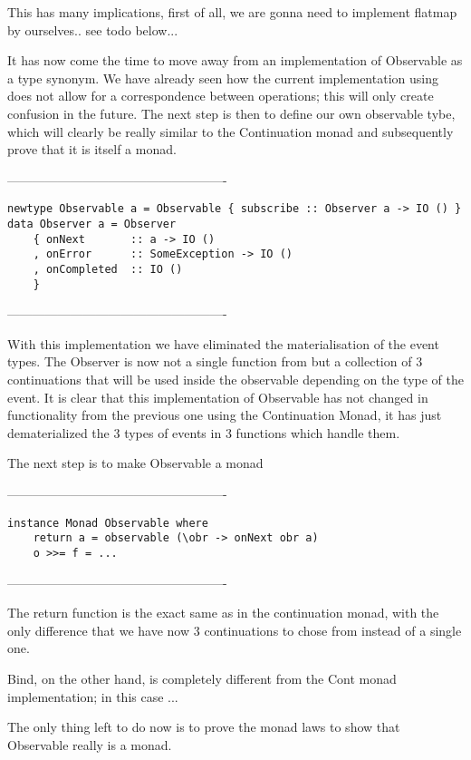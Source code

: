 This has many implications, first of all, we are gonna need to implement flatmap by ourselves.. see todo below...

It has now come the time to move away from an implementation of Observable as a type synonym. We have already seen how the current implementation using  does not allow for a correspondence between \code{>>=} operations; this will only create confusion in the future. The next step is then to define our own observable tybe, which will clearly be really similar to the Continuation monad and subsequently prove that it is itself a monad. 

----------------------------------------------------
\begin{verbatim}
newtype Observable a = Observable { subscribe :: Observer a -> IO () } 
data Observer a = Observer 
    { onNext       :: a -> IO ()
    , onError      :: SomeException -> IO ()
    , onCompleted  :: IO ()
    }
\end{verbatim}
----------------------------------------------------    

With this implementation we have eliminated the materialisation of the event types. The Observer is now not a single function from  but a collection of 3 continuations that will be used inside the observable depending on the type of the event. It is clear that this implementation of Observable has not changed in functionality from the previous one using the Continuation Monad, it has just dematerialized the 3 types of events in 3 functions which handle them.

The next step is to make Observable a monad

----------------------------------------------------
\begin{verbatim}
instance Monad Observable where
	return a = observable (\obr -> onNext obr a)
	o >>= f = ...
\end{verbatim}
----------------------------------------------------  

The return function is the exact same as in the continuation monad, with the only difference that we have now 3 continuations to chose from instead of a single one. 

Bind, on the other hand, is completely different from the Cont monad implementation; in this case ... 

The only thing left to do now is to prove the monad laws to show that Observable really is a monad.


